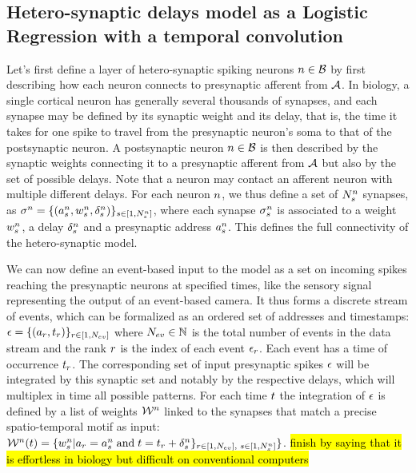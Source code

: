 \documentclass[default]{sn-jnl}%
\theoremstyle{thmstyleone}%
\theoremstyle{thmstyletwo}%
\theoremstyle{thmstylethree}%
\DeclareRobustCommand{\note}[1]{{\sethlcolor{yellow}\hl{#1}}}
\begin{document}
\subsection{Hetero-synaptic delays model as a Logistic Regression with a temporal convolution}

Let's first define a layer of hetero-synaptic spiking neurons $n \in \mathcal{B}$ by first describing how each neuron connects to presynaptic afferent from $\mathcal{A}$. In biology, a single cortical neuron has generally several thousands of synapses, and each synapse may be defined by its synaptic weight and its delay, that is, the time it takes for one spike to travel from the presynaptic neuron's soma to that of the postsynaptic neuron. A postsynaptic neuron $n \in \mathcal{B}$ is then described by the synaptic weights connecting it to a presynaptic afferent from $\mathcal{A}$ but also by the set of possible delays. Note that a neuron may contact an afferent neuron with multiple different delays. For each neuron $n$, we thus define a set of $N_{s}^n$ synapses, as  $\sigma^n = \{(a^n_s, w^n_s, \delta^n_s)\}_{s \in [1,N_{s}^n]}$, where each synapse $\sigma^n_s$ is associated to a weight $w^n_s$, a delay $\delta^n_s$ and a presynaptic address $a^n_s$. This defines the full connectivity of the hetero-synaptic model.

We can now define an event-based input to the model as a set on incoming spikes reaching the presynaptic neurons at specified times, like the sensory signal representing the output of an event-based camera. It thus forms a discrete stream of events, which can be formalized as an ordered set of addresses and timestamps: $\epsilon = \{(a_r, t_r)\}_{r \in [1,N_{ev}]}$ where $N_{ev} \in \mathbb{N} $ is the total number of events in the data stream and the rank $r$ is the index of each event $\epsilon_r$. Each event has a time of occurrence $t_r$. The corresponding set of input presynaptic spikes $\epsilon$ will be integrated by this synaptic set and notably by the respective delays, which will multiplex in time all possible patterns. For each time $t$ the integration of $\epsilon$ is defined by a list of weights $\mathcal{W}^n$ linked to the synapses that match a precise spatio-temporal motif as input:
$
\mathcal{W}^n (t) = 
\{ w_s^n  \vert 
a_r = 
 a_s^n \; \text{and} \; t=t_r + 
\delta_s^n \}_{ r \in [1,N_{ev}]\text{, }s \in [1,N_{s}^n]} 
\}
$.
\note{finish by saying that it is effortless in biology but difficult on conventional computers}
\end{document}
